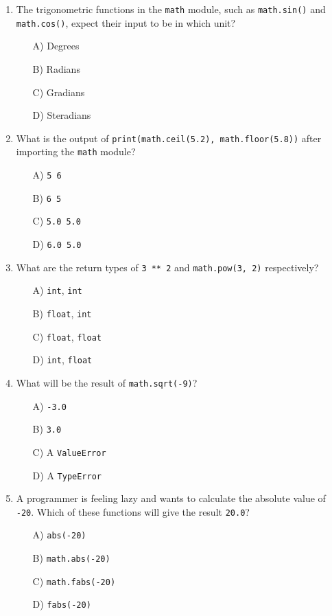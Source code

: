 \documentclass[9pt]{article}
\begin{document}
\begin{multicols}{2}
\begin{enumerate}
\item The trigonometric functions in the \texttt{math} module, such as \texttt{math.sin()} and \texttt{math.cos()}, expect their input to be in which unit?
\begin{enumerate}
    \item[A)] Degrees
    \item[B)] Radians
    \item[C)] Gradians
    \item[D)] Steradians
\end{enumerate}

\item What is the output of \texttt{print(math.ceil(5.2), math.floor(5.8))} after importing the \texttt{math} module?
\begin{enumerate}
    \item[A)] \texttt{5 6}
    \item[B)] \texttt{6 5}
    \item[C)] \texttt{5.0 5.0}
    \item[D)] \texttt{6.0 5.0}
\end{enumerate}

\item What are the return types of \texttt{3 ** 2} and \texttt{math.pow(3, 2)} respectively?
\begin{enumerate}
    \item[A)] \texttt{int}, \texttt{int}
    \item[B)] \texttt{float}, \texttt{int}
    \item[C)] \texttt{float}, \texttt{float}
    \item[D)] \texttt{int}, \texttt{float}
\end{enumerate}

\item What will be the result of \texttt{math.sqrt(-9)}?
\begin{enumerate}
    \item[A)] \texttt{-3.0}
    \item[B)] \texttt{3.0}
    \item[C)] A \texttt{ValueError}
    \item[D)] A \texttt{TypeError}
\end{enumerate}

\item A programmer is feeling lazy and wants to calculate the absolute value of \texttt{-20}. Which of these functions will give the result \texttt{20.0}?
\begin{enumerate}
    \item[A)] \texttt{abs(-20)}
    \item[B)] \texttt{math.abs(-20)}
    \item[C)] \texttt{math.fabs(-20)}
    \item[D)] \texttt{fabs(-20)}
\end{enumerate}


\end{enumerate}
\end{multicols}
\end{document}
